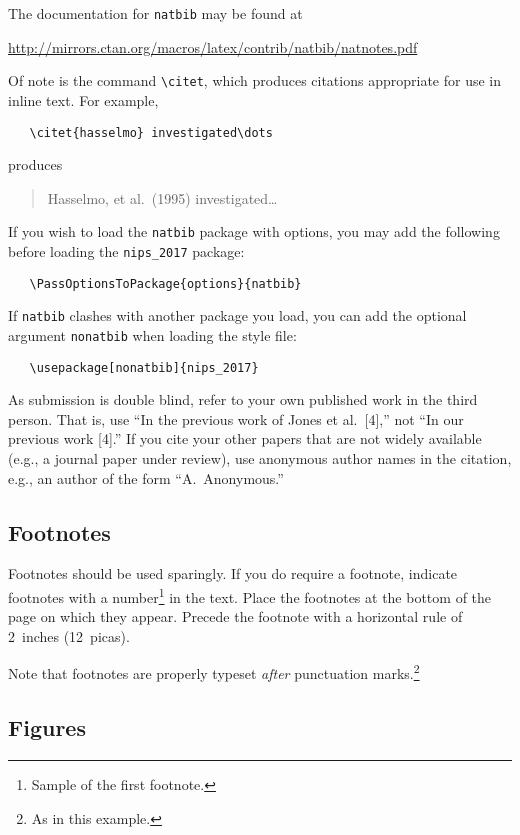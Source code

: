 \documentclass{article}
\begin{document}
The documentation for \verb+natbib+ may be found at
\begin{center}
  \url{http://mirrors.ctan.org/macros/latex/contrib/natbib/natnotes.pdf}
\end{center}
Of note is the command \verb+\citet+, which produces citations
appropriate for use in inline text.  For example,
\begin{verbatim}
   \citet{hasselmo} investigated\dots
\end{verbatim}
produces
\begin{quote}
  Hasselmo, et al.\ (1995) investigated\dots
\end{quote}

If you wish to load the \verb+natbib+ package with options, you may
add the following before loading the \verb+nips_2017+ package:
\begin{verbatim}
   \PassOptionsToPackage{options}{natbib}
\end{verbatim}

If \verb+natbib+ clashes with another package you load, you can add
the optional argument \verb+nonatbib+ when loading the style file:
\begin{verbatim}
   \usepackage[nonatbib]{nips_2017}
\end{verbatim}

As submission is double blind, refer to your own published work in the
third person. That is, use ``In the previous work of Jones et
al.\ [4],'' not ``In our previous work [4].'' If you cite your other
papers that are not widely available (e.g., a journal paper under
review), use anonymous author names in the citation, e.g., an author
of the form ``A.\ Anonymous.''

\subsection{Footnotes}

Footnotes should be used sparingly.  If you do require a footnote,
indicate footnotes with a number\footnote{Sample of the first
  footnote.} in the text. Place the footnotes at the bottom of the
page on which they appear.  Precede the footnote with a horizontal
rule of 2~inches (12~picas).

Note that footnotes are properly typeset \emph{after} punctuation
marks.\footnote{As in this example.}

\subsection{Figures}
\end{document}
